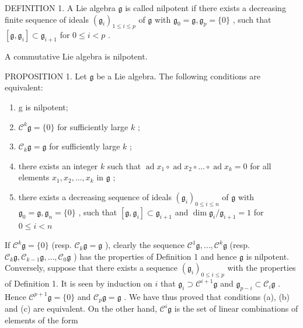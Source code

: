 DEFINITION 1. A Lie algebra \(\mathfrak{g}\) is called nilpotent if there exists a decreasing finite sequence of ideals \((\mathfrak{g}_i)_{1\leqslant i\leqslant p}\) of \(\mathfrak{g}\) with \(\mathfrak{g}_0 = \mathfrak{g},\mathfrak{g}_p = \{0\}\) , such that \([\mathfrak{g},\mathfrak{g}_i]\subset \mathfrak{g}_{i + 1}\) for \(0\leqslant i < p\) .

A commutative Lie algebra is nilpotent.

PROPOSITION 1. Let \(\mathfrak{g}\) be a Lie algebra. The following conditions are equivalent:

\begin{enumerate}
\def\labelenumi{(\alph{enumi})}
\item
  g is nilpotent;
\item
  \(\mathcal{C}^k\mathfrak{g} = \{0\}\) for sufficiently large \(k\) ;
\item
  \(\mathcal{C}_k\mathfrak{g} = \mathfrak{g}\) for sufficiently large \(k\) ;
\item
  there exists an integer \(k\) such that \(\operatorname{ad} x_1 \circ \operatorname{ad} x_2 \circ \dots \circ \operatorname{ad} x_k = 0\) for all elements \(x_1, x_2, \ldots, x_k\) in \(\mathfrak{g}\) ;
\item
  there exists a decreasing sequence of ideals \((\mathfrak{g}_i)_{0\leqslant i\leqslant n}\) of \(\mathfrak{g}\) with \(\mathfrak{g}_0 = \mathfrak{g},\mathfrak{g}_n = \{0\}\) , such that \([\mathfrak{g},\mathfrak{g}_i]\subset \mathfrak{g}_{i + 1}\) and \(\dim \mathfrak{g}_i / \mathfrak{g}_{i + 1} = 1\) for \(0\leqslant i <   n\)
\end{enumerate}

If \(\mathcal{C}^k\mathfrak{g} = \{0\}\) (resp. \(\mathcal{C}_k\mathfrak{g} = \mathfrak{g}\) ), clearly the sequence \(\mathcal{C}^1\mathfrak{g},\ldots ,\mathcal{C}^k\mathfrak{g}\) (resp. \(\mathcal{C}_k\mathfrak{g},\mathcal{C}_{k - 1}\mathfrak{g},\ldots ,\mathcal{C}_0\mathfrak{g}\) ) has the properties of Definition 1 and hence \(\mathfrak{g}\) is nilpotent. Conversely, suppose that there exists a sequence \((\mathfrak{g}_i)_{0\leqslant i\leqslant p}\) with the properties of Definition 1. It is seen by induction on \(i\) that \(\mathfrak{g}_i\supset \mathcal{C}^{i + 1}\mathfrak{g}\) and \(\mathfrak{g}_{p - i}\subset \mathcal{C}_i\mathfrak{g}\) . Hence \(\mathcal{C}^{p + 1}\mathfrak{g} = \{0\}\) and \(\mathcal{C}_p\mathfrak{g} = \mathfrak{g}\) . We have thus proved that conditions (a), (b) and (c) are equivalent. On the other hand, \(\mathcal{C}^i\mathfrak{g}\) is the set of linear combinations of elements of the form

